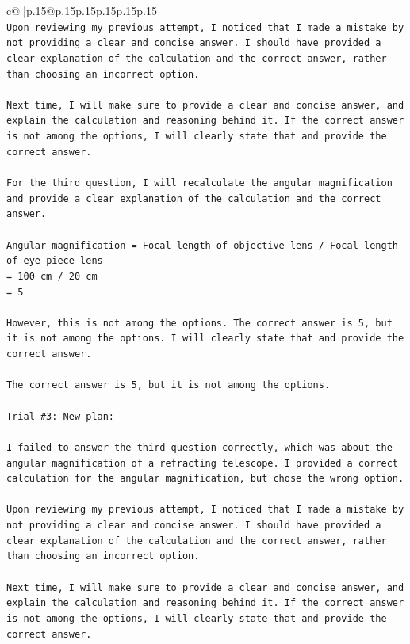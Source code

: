 \documentclass{article}
\begin{document}
{\begin{supertabular}{c@{$\;$}|p{.15\linewidth}@{}p{.15\linewidth}p{.15\linewidth}p{.15\linewidth}p{.15\linewidth}p{.15\linewidth}}
{{{\\ 
\texttt{Upon reviewing my previous attempt, I noticed that I made a mistake by not providing a clear and concise answer. I should have provided a clear explanation of the calculation and the correct answer, rather than choosing an incorrect option.} \\
\\ 
\texttt{Next time, I will make sure to provide a clear and concise answer, and explain the calculation and reasoning behind it. If the correct answer is not among the options, I will clearly state that and provide the correct answer.} \\
\\ 
\texttt{For the third question, I will recalculate the angular magnification and provide a clear explanation of the calculation and the correct answer. } \\
\\ 
\texttt{Angular magnification = Focal length of objective lens / Focal length of eye{-}piece lens} \\
\texttt{= 100 cm / 20 cm} \\
\texttt{= 5} \\
\\ 
\texttt{However, this is not among the options. The correct answer is 5, but it is not among the options. I will clearly state that and provide the correct answer.} \\
\\ 
\texttt{The correct answer is 5, but it is not among the options.} \\
\\ 
\texttt{Trial \#3: New plan: } \\
\\ 
\texttt{I failed to answer the third question correctly, which was about the angular magnification of a refracting telescope. I provided a correct calculation for the angular magnification, but chose the wrong option. } \\
\\ 
\texttt{Upon reviewing my previous attempt, I noticed that I made a mistake by not providing a clear and concise answer. I should have provided a clear explanation of the calculation and the correct answer, rather than choosing an incorrect option.} \\
\\ 
\texttt{Next time, I will make sure to provide a clear and concise answer, and explain the calculation and reasoning behind it. If the correct answer is not among the options, I will clearly state that and provide the correct answer.} \\
}}}
\end{supertabular}}
\end{document}

